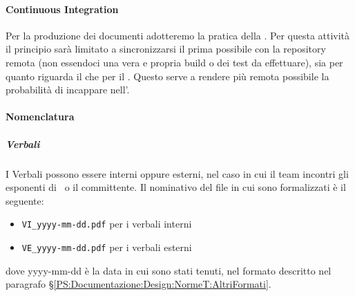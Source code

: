 			

			\paragraph{Continuous Integration}\label{ContinuousIntegration}
			Per la produzione dei documenti adotteremo la pratica della .
			Per questa attività il principio sarà limitato a sincronizzarsi il prima possibile con la repository remota (non essendoci una vera e propria build o dei test da effettuare),
			sia per quanto riguarda il  che per il .
			Questo serve a rendere più remota possibile la probabilità di incappare nell'.

			\paragraph{Nomenclatura} %

			\subparagraph{Verbali}	\label{NomenclaturaVerbali}
			I Verbali  possono essere interni oppure esterni, nel caso in cui il team incontri gli esponenti di \II\ o il committente.
			Il nominativo del file in cui sono formalizzati è il seguente:
			\begin{itemize}
				\item \texttt{VI\_yyyy-mm-dd.pdf} per i verbali interni
				\item \texttt{VE\_yyyy-mm-dd.pdf} per i verbali esterni
			\end{itemize}
			dove yyyy-mm-dd è la data in cui sono stati tenuti, nel formato descritto nel paragrafo \S\ref{PS:Documentazione:Design:NormeT:AltriFormati}.

